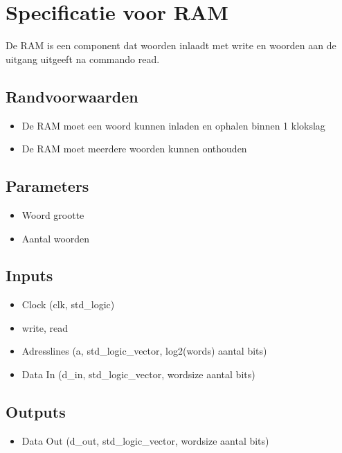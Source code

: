 \documentclass{article}
\begin{document}
\section{Specificatie voor RAM}
De RAM is een component dat woorden inlaadt met write en woorden aan de uitgang uitgeeft na commando read. 
\subsection{Randvoorwaarden}
\begin{itemize}
\item De RAM moet een woord kunnen inladen en ophalen binnen 1 klokslag
\item De RAM moet meerdere woorden kunnen onthouden
\end{itemize}
\subsection{Parameters}
\begin{itemize}
\item Woord grootte
\item Aantal woorden

\end{itemize}
\subsection{Inputs}
\begin{itemize}
\item Clock (clk, std\_logic)
\item write, read
\item Adresslines (a, std\_logic\_vector, log2(words) aantal bits)
\item Data In (d\_in, std\_logic\_vector, wordsize aantal bits)
\end{itemize}
\subsection{Outputs}
\begin{itemize}
\item Data Out (d\_out, std\_logic\_vector, wordsize aantal bits)
\end{itemize}
\end{document}
